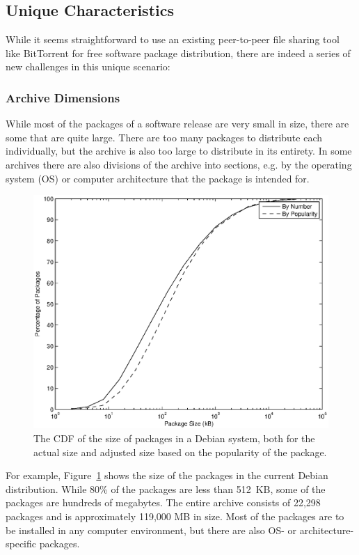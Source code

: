 \documentclass[conference]{IEEEtran}
\begin{document}
\subsection{Unique Characteristics}
\label{problems}

While it seems straightforward to use an existing peer-to-peer file sharing tool like BitTorrent for
free software package distribution, there are indeed a series of new challenges in this unique scenario:

\subsubsection{Archive Dimensions}

While most of the packages of a software release are very small in
size, there are some that are quite large. There are too many
packages to distribute each individually, but the archive is also
too large to distribute in its entirety. In some archives there are
also divisions of the archive into sections, e.g. by the operating system (OS) or computer
architecture that the package is intended for.

\begin{figure}
\centering
\includegraphics[width=\columnwidth]{apt_p2p_simulation-size_CDF.eps}
\caption{The CDF of the size of packages in a Debian system, both
for the actual size and adjusted size based on the popularity of
the package.}
\label{size_CDF}
\end{figure}

For example, Figure~\ref{size_CDF} shows the size of the packages in the
current Debian distribution. While 80\% of the packages are less than
512~KB, some of the packages are hundreds of megabytes. The entire
archive consists of 22,298 packages and is approximately 119,000 MB
in size. Most of the packages are to be installed in any computer environment, but there are
also OS- or architecture-specific packages.
\end{document}
